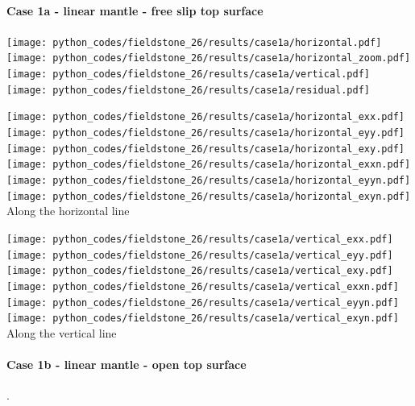 \paragraph{Case 1a - linear mantle - free slip top surface} 

\begin{center}
\texttt{[image: python\_codes/fieldstone\_26/results/case1a/horizontal.pdf]}
\texttt{[image: python\_codes/fieldstone\_26/results/case1a/horizontal\_zoom.pdf]}\\
\texttt{[image: python\_codes/fieldstone\_26/results/case1a/vertical.pdf]}
\texttt{[image: python\_codes/fieldstone\_26/results/case1a/residual.pdf]}
\end{center}

\begin{center}
\texttt{[image: python\_codes/fieldstone\_26/results/case1a/horizontal\_exx.pdf]}
\texttt{[image: python\_codes/fieldstone\_26/results/case1a/horizontal\_eyy.pdf]}
\texttt{[image: python\_codes/fieldstone\_26/results/case1a/horizontal\_exy.pdf]}\\
\texttt{[image: python\_codes/fieldstone\_26/results/case1a/horizontal\_exxn.pdf]}
\texttt{[image: python\_codes/fieldstone\_26/results/case1a/horizontal\_eyyn.pdf]}
\texttt{[image: python\_codes/fieldstone\_26/results/case1a/horizontal\_exyn.pdf]}\\
{\captionfont Along the horizontal line}
\end{center}

\begin{center}
\texttt{[image: python\_codes/fieldstone\_26/results/case1a/vertical\_exx.pdf]}
\texttt{[image: python\_codes/fieldstone\_26/results/case1a/vertical\_eyy.pdf]}
\texttt{[image: python\_codes/fieldstone\_26/results/case1a/vertical\_exy.pdf]}\\
\texttt{[image: python\_codes/fieldstone\_26/results/case1a/vertical\_exxn.pdf]}
\texttt{[image: python\_codes/fieldstone\_26/results/case1a/vertical\_eyyn.pdf]}
\texttt{[image: python\_codes/fieldstone\_26/results/case1a/vertical\_exyn.pdf]}\\
{\captionfont Along the vertical line}
\end{center}

\newpage
\paragraph{Case 1b - linear mantle - open top surface} . 


